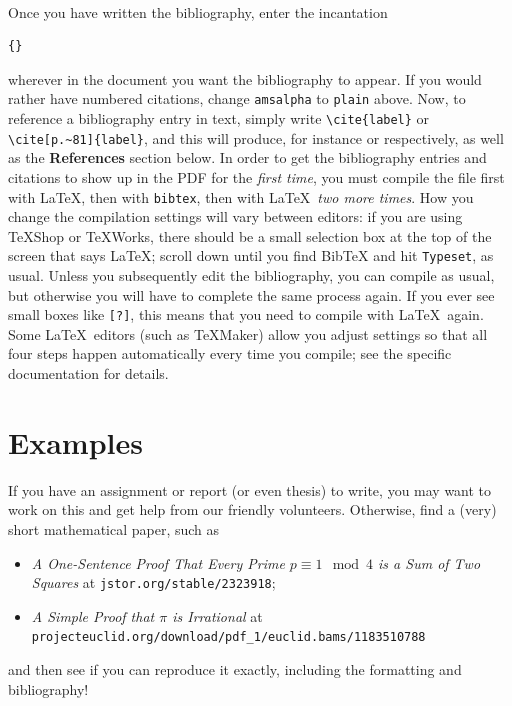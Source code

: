 \documentclass[11pt]{article}
\begin{document}
\paragraph{}

Once you have written the bibliography, enter the incantation
\begin{verbatim}
{}

\end{verbatim}
wherever in the document you want the bibliography to appear. If you would rather have numbered citations, change \texttt{amsalpha} to \texttt{plain} above. Now, to reference a bibliography entry in text, simply write \verb$\cite{label}$ or \verb$\cite[p.~81]{label}$, and this will produce, for instance \cite{KN} or \cite[p.~81]{KN} respectively, as well as the \textbf{References} section below. In order to get the bibliography entries and citations to show up in the PDF for the \textit{first time}, you must compile the file first with \LaTeX , then with \texttt{bibtex}, then with \LaTeX\  \textit{two more times}. How you change the compilation settings  will vary between editors: if you are using TeXShop or TeXWorks, there should be a small selection box at the top of the screen that says \LaTeX; scroll down until you find BibTeX and hit \texttt{Typeset}, as usual. Unless you subsequently edit the bibliography, you can compile as usual, but otherwise you will have to complete the same process again. If you ever see small boxes like \verb$[?]$, this means that you need to compile with \LaTeX\ again. Some \LaTeX\ editors (such as TeXMaker) allow you adjust settings so that all four steps happen automatically every time you compile; see the specific documentation for details.

{}


\section{Examples}

If you have an assignment or report (or even thesis) to write, you may want to work on this and get help from our friendly volunteers. Otherwise, find a (very) short mathematical paper, such as
\begin{itemize}
\item \textit{A One-Sentence Proof That Every Prime $p \equiv 1 \mod 4$ is a Sum of Two Squares} at \verb$jstor.org/stable/2323918$;
\item  \textit{A Simple Proof that $\pi$ is Irrational} at \verb$projecteuclid.org/download/pdf_1/euclid.bams/1183510788$
\end{itemize}
and then see if you can reproduce it exactly, including the formatting and bibliography!
\end{document}
